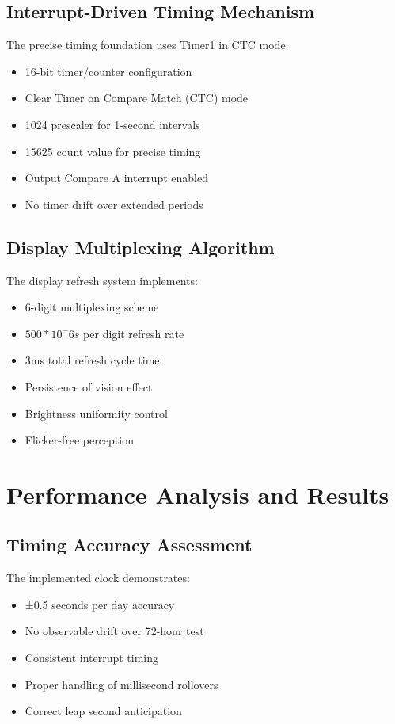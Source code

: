 \documentclass[a4paper,12pt]{article}
\begin{document}
\subsection{Interrupt-Driven Timing Mechanism}
The precise timing foundation uses Timer1 in CTC mode:

\begin{itemize}
    \item 16-bit timer/counter configuration
    \item Clear Timer on Compare Match (CTC) mode
    \item 1024 prescaler for 1-second intervals
    \item 15625 count value for precise timing
    \item Output Compare A interrupt enabled
    \item No timer drift over extended periods
\end{itemize}

\subsection{Display Multiplexing Algorithm}
The display refresh system implements:

\begin{itemize}
    \item 6-digit multiplexing scheme
    \item $500*10^-6s$ per digit refresh rate
    \item 3ms total refresh cycle time
    \item Persistence of vision effect
    \item Brightness uniformity control
    \item Flicker-free perception
\end{itemize}

\section{Performance Analysis and Results}

\subsection{Timing Accuracy Assessment}
The implemented clock demonstrates:

\begin{itemize}
    \item ±0.5 seconds per day accuracy
    \item No observable drift over 72-hour test
    \item Consistent interrupt timing
    \item Proper handling of millisecond rollovers
    \item Correct leap second anticipation
\end{itemize}
\end{document}
